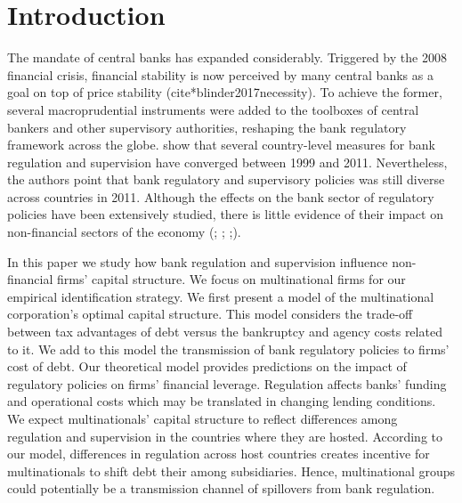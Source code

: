 \documentclass[12pt]{article}
\begin{document}
	\section{Introduction} \label{sec:introduction}
	The mandate of central banks has expanded considerably. Triggered by the 2008 financial crisis, financial stability is now perceived by many central banks as a goal on top of price stability (cite*{blinder2017necessity}). To achieve the former, several macroprudential instruments were added to the toolboxes of central bankers and other supervisory authorities, reshaping the bank regulatory framework across the globe. \cite*{barth2013bank} show that several country-level measures for bank regulation and supervision have converged between 1999 and 2011. Nevertheless, the authors point that bank regulatory and supervisory policies was still  diverse across countries in 2011. Although the effects on the bank sector of regulatory policies have been extensively studied, there is little evidence of their impact on non-financial sectors of the economy (\cite*{barth2013}; \cite*{anginer2014does}; \cite*{caprio2014macro};\cite*{demirguc2013bank}). 
	
	In this paper we study how bank regulation and supervision influence non-financial firms' capital structure. We focus on multinational firms for our empirical identification strategy. We first present a model of the multinational corporation's optimal capital structure. This model considers the trade-off between tax advantages of debt versus the bankruptcy and agency costs related to it. We add to this model the transmission of bank regulatory policies to firms' cost of debt. Our theoretical model provides predictions on the impact of regulatory policies on firms' financial leverage. Regulation affects banks' funding and operational costs which may be translated in changing lending conditions. We expect multinationals' capital structure to reflect differences among regulation and supervision in the countries where they are hosted. According to our model, differences in regulation across host countries creates incentive for multinationals to shift debt  their among subsidiaries. Hence, multinational groups could potentially be a transmission channel of spillovers from bank regulation. 
	
\end{document}
